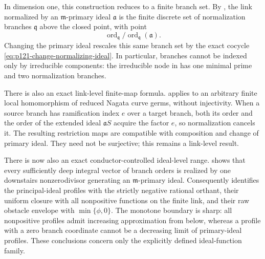 In dimension one, this construction reduces to a finite branch set. By
, the link normalized by an
\(\mathfrak m\)-primary ideal \(\mathfrak a\) is the finite discrete set of
normalization branches \(\mathfrak q\) above the closed point, with point
\[
  \operatorname{ord}_{\mathfrak q}/
  \operatorname{ord}_{\mathfrak q}(\mathfrak a).
\]
Changing the primary ideal rescales this same branch set by the exact
cocycle \eqref{eq:p121-change-normalizing-ideal}.  In particular, branches
cannot be indexed only by irreducible components: the irreducible node in
 has one minimal prime and two
normalization branches.

There is also an exact link-level finite-map formula.
 applies to an arbitrary finite
local homomorphism of reduced Nagata curve germs, without injectivity.  When
a source branch has ramification index \(e\) over a target branch, both its
order and the order of the extended ideal \(\mathfrak aS\) acquire the
factor \(e\), so normalization cancels it.  The resulting restriction maps
are compatible with composition and change of primary ideal.  They need not
be surjective; this remains a link-level result.

There is now also an exact conductor-controlled ideal-level range.
 shows that every
sufficiently deep integral vector of branch orders is realized by one
downstairs nonzerodivisor generating an \(\mathfrak m\)-primary ideal.
Consequently  identifies the
principal-ideal profiles with the strictly negative rational orthant, their
uniform closure with all nonpositive functions on the finite link, and their
raw obstacle envelope with \(\min\{\phi,0\}\).  The monotone boundary is
sharp: all nonpositive profiles admit increasing approximation from below,
whereas a profile with a zero branch coordinate cannot be a decreasing limit
of primary-ideal profiles.  These conclusions concern only the explicitly
defined ideal-function family.

